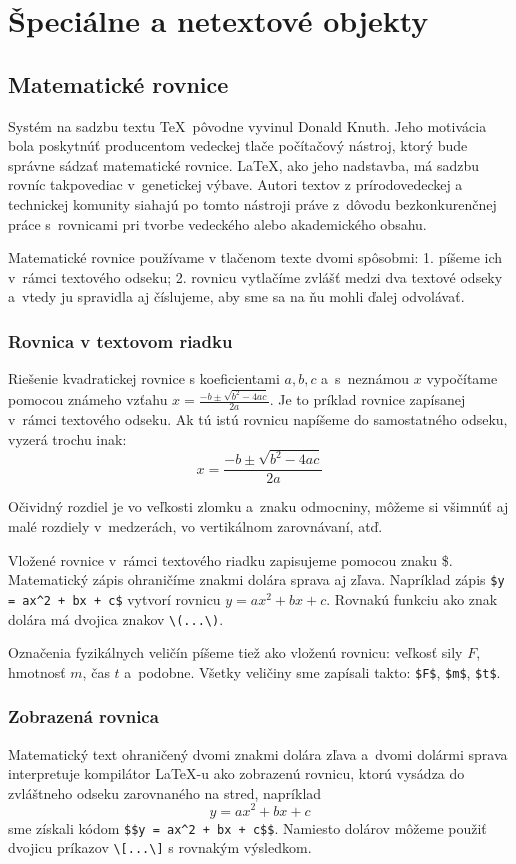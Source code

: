 \chapter{Špeciálne a netextové objekty}
\section{Matematické rovnice}
Systém na sadzbu textu \TeX\ pôvodne vyvinul Donald Knuth.
Jeho motivácia bola poskytnúť producentom vedeckej tlače
počítačový nástroj,
ktorý bude správne sádzať matematické rovnice.
\LaTeX, ako jeho nadstavba, má sadzbu rovníc takpovediac
v~genetickej výbave.
Autori textov z prírodovedeckej a technickej komunity siahajú po tomto nástroji
práve z~dôvodu bezkonkurenčnej práce s~rovnicami pri tvorbe
vedeckého alebo akademického obsahu.

Matematické rovnice používame v tlačenom texte dvomi spôsobmi:
1. píšeme ich v~rámci textového odseku;
2. rovnicu vytlačíme zvlášť medzi dva textové odseky
a~vtedy ju spravidla aj číslujeme, aby sme sa na ňu mohli
ďalej odvolávať.

\subsection{Rovnica v textovom riadku}
Riešenie kvadratickej rovnice s koeficientami $a,b,c$
a~s~neznámou $x$ vypočítame pomocou známeho vzťahu
$x=\frac{-b\pm\sqrt{b^2-4ac}}{2a}$.
Je to príklad rovnice zapísanej v~rámci textového odseku.
Ak tú istú rovnicu napíšeme do samostatného odseku,
vyzerá trochu inak:
$$
  x=\frac{-b\pm\sqrt{b^2-4ac}}{2a}
$$

Očividný rozdiel je vo veľkosti zlomku a~znaku odmocniny,
môžeme si všimnúť aj malé rozdiely v~medzerách,
vo vertikálnom zarovnávaní, atď.

Vložené rovnice v~rámci textového riadku zapisujeme pomocou
znaku \$.
Matematický zápis ohraničíme znakmi dolára sprava aj zľava.
Napríklad zápis \verb|$y = ax^2 + bx + c$| vytvorí rovnicu $y = ax^2 + bx + c$. Rovnakú funkciu ako znak dolára má dvojica znakov \verb|\(...\)|.

Označenia fyzikálnych veličín píšeme tiež ako vloženú rovnicu:
veľkosť sily $F$, hmotnosť $m$, čas $t$ a~podobne.
Všetky veličiny sme zapísali takto: \verb|$F$|,
\verb|$m$|, \verb|$t$|.

\subsection{Zobrazená rovnica}
Matematický text ohraničený dvomi znakmi dolára zľava
a~dvomi dolármi sprava interpretuje kompilátor \LaTeX-u
ako zobrazenú rovnicu, ktorú vysádza do zvláštneho odseku
zarovnaného na stred, napríklad
$$
  y = ax^2 + bx + c
$$
sme získali kódom \verb|$$y = ax^2 + bx + c$$|.
Namiesto dolárov môžeme použiť dvojicu príkazov
\verb|\[...\]| s rovnakým výsledkom.

